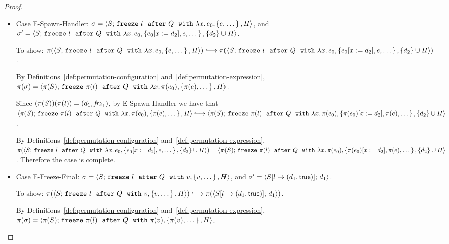 \begin{proof}
\begin{itemize}
    \item Case {\sc E-Spawn-Handler}: $\sigma =
      \langle S;\, \mbox{\texttt{freeze}}~l~~{\mbox{\texttt{after}}}~Q~~{\mbox{\texttt{with}}}~\lambda x.\,e_0, \left\{e,
            \dots\right\}, H \rangle$, and $\sigma' =
      \langle S;\, \mbox{\texttt{freeze}}~l~~{\mbox{\texttt{after}}}~Q~~{\mbox{\texttt{with}}}~\lambda x.\,e_0, \left\{e_0[x := d_2],
            e, \dots\right\}, \{d_2\}\cup H \rangle$.

      To show:
      $\pi(\config{S}{\freezeafterfull{l}{Q}{\lam{x}{e_0}}{\setof{e,
            \dots}}{H}}) \parstepsto
      \pi(\config{S}{\freezeafterfull{l}{Q}{\lam{x}{e_0}}{\setof{\subst{e_0}{x}{d_2},
            e, \dots}} {\{d_2\}\cup H}})$.

      By Definitions~\ref{def:permutation-configuration}
      and~\ref{def:permutation-expression}, $\pi(\sigma) =
      \langle \pi(S);\, \mbox{\texttt{freeze}}~\pi(l)~~{\mbox{\texttt{after}}}~Q~~{\mbox{\texttt{with}}}~\lambda x.\,\pi(e_0), \left\{\pi(e),
            \dots\right\}, H \rangle$.

      Since $(\pi(S))(\pi(l)) = (d_1, \mathit{frz}_1)$, by {\sc
        E-Spawn-Handler} we have that
      $\config{\pi(S)}{\freezeafterfull{\pi(l)}{Q}{\lam{x}{\pi(e_0)}}{\setof{\pi(e),
            \dots}}{H}} \parstepsto
      \config{\pi(S)}{\freezeafterfull{\pi(l)}{Q}{\lam{x}{\pi(e_0)}}{\setof{\subst{\pi(e_0)}{x}{d_2},
            \pi(e), \dots}} {\{d_2\}\cup H}}$.

      By Definitions~\ref{def:permutation-configuration}
      and~\ref{def:permutation-expression},
      $\pi(\langle S;\, \mbox{\texttt{freeze}}~l~~{\mbox{\texttt{after}}}~Q~~{\mbox{\texttt{with}}}~\lambda x.\,e_0, \left\{e_0[x := d_2],
            e, \dots\right\}, \{d_2\}\cup H \rangle) =
      \langle \pi(S);\, \mbox{\texttt{freeze}}~\pi(l)~~{\mbox{\texttt{after}}}~Q~~{\mbox{\texttt{with}}}~\lambda x.\,\pi(e_0), \left\{\pi(e_0)[x := d_2],
            \pi(e), \dots\right\}, \{d_2\}\cup H \rangle$.  Therefore the case is
      complete.

    \item Case {\sc E-Freeze-Final}: $\sigma =
      \langle S;\, \mbox{\texttt{freeze}}~l~~{\mbox{\texttt{after}}}~Q~~{\mbox{\texttt{with}}}~v, \left\{v, \dots\right\}, H \rangle$, and
      $\sigma' = \langle S[l \mapsto (d_1, \textsf{true})];\, d_1 \rangle$.

      To show: $\pi(\config{S}{\freezeafterfull{l}{Q}{v}{\setof{v,
            \dots}}{H}}) \parstepsto
      \pi(\config{\extS{S}{l}{d_1}{\frozentrue}}{d_1})$.

      By Definitions~\ref{def:permutation-configuration}
      and~\ref{def:permutation-expression}, $\pi(\sigma) =
      \langle \pi(S);\, \mbox{\texttt{freeze}}~\pi(l)~~{\mbox{\texttt{after}}}~Q~~{\mbox{\texttt{with}}}~\pi(v), \left\{\pi(v),
            \dots\right\}, H \rangle$.



\end{itemize}
\end{proof}
